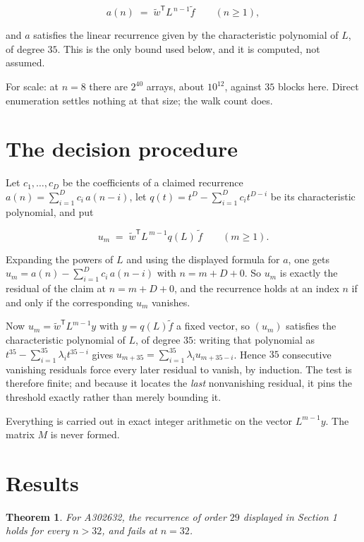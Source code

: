 \documentclass[11pt]{article}
\newtheorem{theorem}{Theorem}
\theoremstyle{definition}
\begin{document}
\[a(n) \;=\; \tilde w^{\mathsf T} L^{\,n-1} \tilde f \qquad (n \ge 1),\]

and $a$ satisfies the linear recurrence given by the characteristic polynomial of $L$, of degree $35$. This is the only bound used below, and it is computed, not assumed.

For scale: at $n = 8$ there are $2^{40}$ arrays, about $10^{12}$, against $35$ blocks here. Direct enumeration settles nothing at that size; the walk count does.

\section{The decision procedure}

Let $c_1,\dots,c_D$ be the coefficients of a claimed recurrence $a(n) = \sum_{i=1}^{D} c_i\,a(n-i)$, let $q(t) = t^{D} - \sum_{i=1}^{D} c_i t^{D-i}$ be its characteristic polynomial, and put

\[u_m \;=\; \tilde w^{\mathsf T} L^{\,m-1} q(L)\,\tilde f \qquad (m \ge 1).\]

Expanding the powers of $L$ and using the displayed formula for $a$, one gets $u_m = a(n) - \sum_{i=1}^{D} c_i\,a(n-i)$ with $n = m + D + 0$. So $u_m$ is exactly the residual of the claim at $n = m + D + 0$, and the recurrence holds at an index $n$ if and only if the corresponding $u_m$ vanishes.

Now $u_m = \tilde w^{\mathsf T} L^{m-1} y$ with $y = q(L)\tilde f$ a fixed vector, so $(u_m)$ satisfies the characteristic polynomial of $L$, of degree $35$: writing that polynomial as $t^{35} - \sum_{i=1}^{35} \lambda_i t^{35-i}$ gives $u_{m+35} = \sum_{i=1}^{35} \lambda_i u_{m+35-i}$. Hence $35$ consecutive vanishing residuals force every later residual to vanish, by induction. The test is therefore finite; and because it locates the {\itshape last} nonvanishing residual, it pins the threshold exactly rather than merely bounding it.

Everything is carried out in exact integer arithmetic on the vector $L^{m-1}y$. The matrix $M$ is never formed.

\section{Results}

\begin{theorem} For A302632, the recurrence of order $29$ displayed in Section 1 holds for every $n > 32$, and fails at $n = 32$.\end{theorem}
\end{document}
